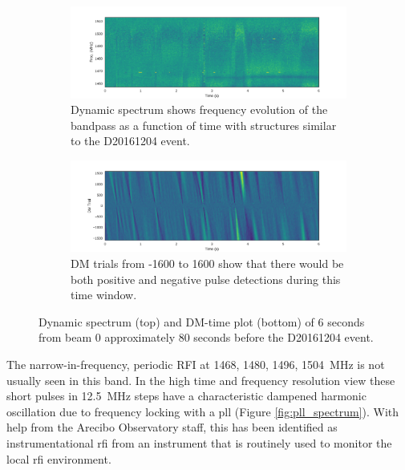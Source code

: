 \documentclass[a4paper,fleqn,usenatbib]{mnras}
\begin{document}
\begin{figure}
    \centering
    \begin{subfigure}[t]{1.0\textwidth}
        \centering\captionsetup{width=.95\linewidth}
        \includegraphics[width=1.0\textwidth]{figures/D20161204_spect_buf21_Beam0.pdf}
        \caption{Dynamic spectrum shows frequency evolution of the bandpass as a
        function of time with structures similar to the D20161204 event.
        }
        \label{fig:beam0_dynamic_spec_80s}
    \end{subfigure}
    \begin{subfigure}[t]{1.0\textwidth}
        \centering\captionsetup{width=.95\linewidth}
        \includegraphics[width=1.0\textwidth]{figures/D20161204_dmtrials_buf21_Beam0.pdf}
        \caption{DM trials from -1600 to 1600 show that there would be both
        positive and negative pulse detections during this time window.
        }
        \label{fig:beam0_dmtrials_80s}
    \end{subfigure}
    \caption{Dynamic spectrum (top) and DM-time plot (bottom) of 6 seconds from
    beam 0 approximately 80 seconds before the D20161204 event.
    }
    \label{fig:beamo0_80s}
\end{figure}

The narrow-in-frequency, periodic RFI at 1468, 1480, 1496,
1504~MHz is not usually seen in this band. In the high time and frequency
resolution view these short pulses in 12.5~MHz steps have a characteristic
dampened harmonic oscillation due to frequency locking with a \gls{pll} (Figure
\ref{fig:pll_spectrum}). With help from the Arecibo Observatory staff, this has
been identified as instrumentational \gls{rfi} from an instrument that is
routinely used to monitor the local \gls{rfi} environment.
\end{document}
